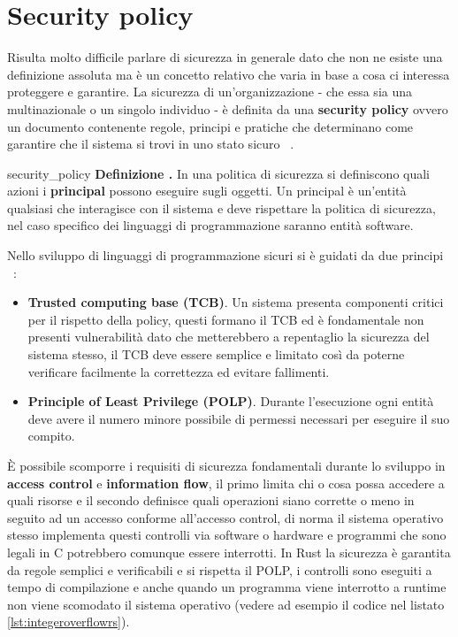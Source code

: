 \documentclass[Lau,binding=0.6cm]{sapthesis}
\newenvironment{myDefinition}[2]{ \begin{Definizione}[adjusted title=#1]{}{#2}
    \textbf{Definizione \thetcbcounter.} }{\end{Definizione}}
\begin{document}
\chapter{Security policy} \label{chap:security_policy}

Risulta molto difficile parlare di sicurezza in generale dato che non ne esiste una definizione assoluta ma è un concetto relativo che varia in base a cosa ci interessa proteggere e garantire. 
La sicurezza di un'organizzazione - che essa sia una multinazionale o un singolo individuo - è definita da una \textbf{security policy}  ovvero un documento contenente regole, principi e pratiche che determinano come garantire che il sistema si trovi in uno stato sicuro ~\cite{milner:type_polymorphism}. 

\begin{myDefinition}{Security policy}{security_policy}
    In una politica di sicurezza si definiscono quali azioni i \textbf{principal} possono eseguire sugli oggetti. Un principal è un'entità qualsiasi che interagisce con il sistema e deve rispettare la politica di sicurezza, nel caso specifico dei linguaggi di programmazione saranno entità software.
\end{myDefinition}

Nello sviluppo di linguaggi di programmazione sicuri si è guidati da due principi ~\cite{nino:security_programming_language}:
\begin{itemize}
    \item \textbf{Trusted computing base (TCB)}. Un sistema presenta componenti critici per il rispetto della policy, questi formano il TCB ed è fondamentale non presenti vulnerabilità dato che metterebbero a repentaglio la sicurezza del sistema stesso, il TCB deve essere semplice e limitato così da poterne verificare facilmente la correttezza ed evitare fallimenti. 
    \item \textbf{Principle of Least Privilege (POLP)}. Durante l'esecuzione ogni entità deve avere il numero minore possibile di permessi necessari per eseguire il suo compito. 
\end{itemize} 
È possibile scomporre i requisiti di sicurezza fondamentali durante lo sviluppo in \textbf{access control} e \textbf{information flow}, il primo limita chi o cosa possa accedere a quali risorse e il secondo definisce quali operazioni siano corrette o meno in seguito ad un accesso conforme all'accesso control, di norma il sistema operativo stesso implementa questi controlli via software o hardware e programmi che sono legali in C potrebbero comunque essere interrotti. 
In Rust la sicurezza è garantita da regole semplici e verificabili e si rispetta il POLP, i controlli sono eseguiti a tempo di compilazione e anche quando un programma viene interrotto a runtime non viene scomodato il sistema operativo (vedere ad esempio il codice nel listato \ref{lst:integeroverflowrs}).
\end{document}
